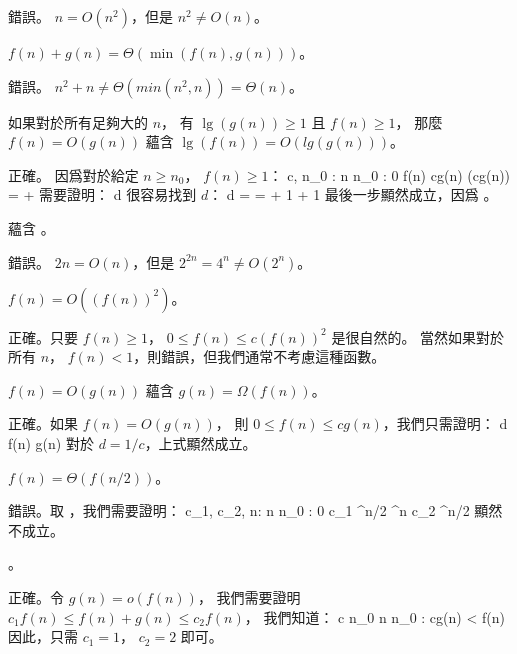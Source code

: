 \startANSWER
錯誤。 $n = O(n^2)$，但是 $n^2 \ne O(n)$。
\stopANSWER

\item $f(n) + g(n) = \Theta(\min(f(n), g(n)))$。

\startANSWER
錯誤。 $n^2 + n \ne \Theta(min(n^2, n)) = \Theta(n)$。
\stopANSWER

\item 如果對於所有足夠大的 $n$，
有 $\lg(g(n))\ge 1$ 且 $f(n)\ge 1$，
那麼 $f(n) = O(g(n))$ 蘊含 $\lg(f(n)) = O(lg(g(n)))$。

\startANSWER
正確。 因爲對於給定 $n \ge n_0$， $f(n) \ge 1$：
\startformula
\exists c, n_0 : \forall n \ge n_0 : 0 \le f(n) \le cg(n)
\stopformula
\startformula
   \Downarrow
\stopformula
{} \le {} \le \lg(cg(n)) =  + 
\stopformula
需要證明：
\startformula
{} \le d
\stopformula
很容易找到 $d$：
\startformula
d = 
=  + 1
\le {} + 1
\stopformula
最後一步顯然成立，因爲 。
\stopANSWER

\item {} 蘊含 。

\startANSWER
錯誤。 $2n = O(n)$，但是 $2^{2n} = 4^n \ne O(2^n)$。
\stopANSWER

\item $f(n) = O((f(n))^2)$。

\startANSWER
正確。只要 $f(n) \ge 1$， $0 \le f(n) \le c(f(n))^2$ 是很自然的。
當然如果對於所有 $n$， $f(n) < 1$，則錯誤，但我們通常不考慮這種函數。
\stopANSWER

\item $f(n) = O(g(n))$ 蘊含 $g(n) = \Omega(f(n))$。

\startANSWER
正確。如果 $f(n) = O(g(n))$，
則 $0 \le f(n) \le cg(n)$，我們只需證明：
 \le d f(n) \le g(n)
\stopformula
對於 $d = 1/c$，上式顯然成立。
\stopANSWER

\item $f(n) = \Theta(f(n/2))$。

\startANSWER
錯誤。取 ，我們需要證明：
\startformula
\exists c_1, c_2, n: \forall n \geq n_0 : 0 \leq c_1 ^{n/2} ^n
   \leq c_2 ^{n/2}
\stopformula
顯然不成立。
\stopANSWER

\item {}。

\startANSWER
正確。令 $g(n) = o(f(n))$，
我們需要證明 $c_1 f(n) \le f(n) + g(n) \le c_2 f(n)$，
我們知道：
\startformula
\forall c \exists n_0 \forall n \geq n_0 : cg(n) < f(n)
\stopformula
因此，只需 $c_1 = 1$， $c_2 = 2$ 即可。
\stopANSWER

